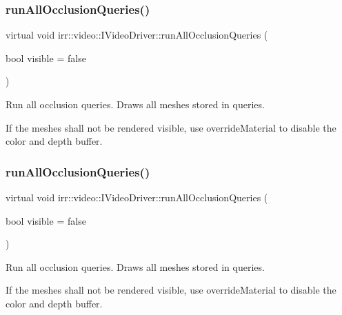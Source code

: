 \subsubsection{\texorpdfstring{run\+All\+Occlusion\+Queries()}{runAllOcclusionQueries()}\hspace{0.1cm}{\footnotesize\ttfamily [1/2]}}
{\footnotesize\ttfamily virtual void irr\+::video\+::\+I\+Video\+Driver\+::run\+All\+Occlusion\+Queries (\begin{DoxyParamCaption}\item[{bool}]{visible = {\ttfamily false} }\end{DoxyParamCaption})\hspace{0.3cm}{\ttfamily [pure virtual]}}



Run all occlusion queries. Draws all meshes stored in queries. 

If the meshes shall not be rendered visible, use override\+Material to disable the color and depth buffer. \mbox{\label{classirr_1_1video_1_1IVideoDriver_ae2ba500924a7d74fe74dd4724b737628}} 
\subsubsection{\texorpdfstring{run\+All\+Occlusion\+Queries()}{runAllOcclusionQueries()}\hspace{0.1cm}{\footnotesize\ttfamily [2/2]}}
{\footnotesize\ttfamily virtual void irr\+::video\+::\+I\+Video\+Driver\+::run\+All\+Occlusion\+Queries (\begin{DoxyParamCaption}\item[{bool}]{visible = {\ttfamily false} }\end{DoxyParamCaption})\hspace{0.3cm}{\ttfamily [pure virtual]}}



Run all occlusion queries. Draws all meshes stored in queries. 

If the meshes shall not be rendered visible, use override\+Material to disable the color and depth buffer. \mbox{\label{classirr_1_1video_1_1IVideoDriver_aaf92a35268dad06996c4f5edabec249f}} 
